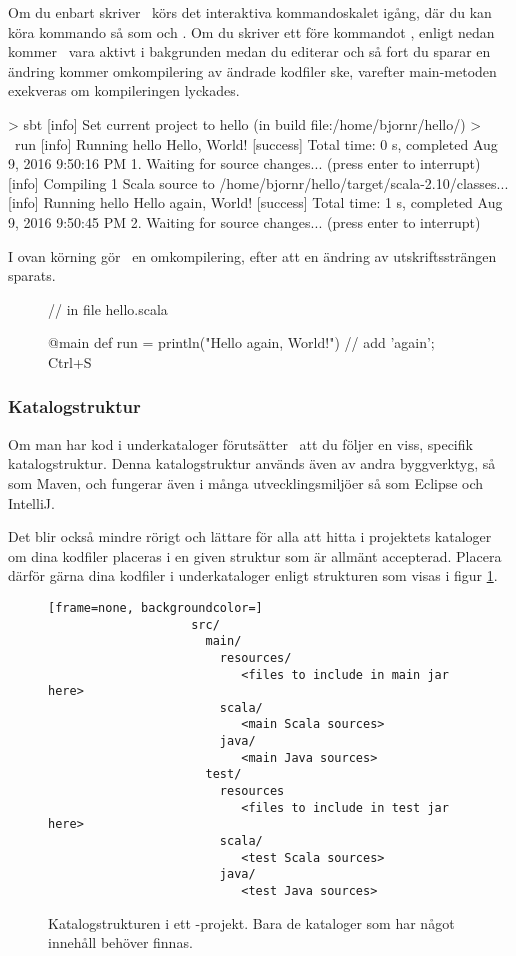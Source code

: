 Om du enbart skriver \sbt\ körs det interaktiva kommandoskalet igång, där du kan köra kommando så som  och . Om du skriver ett \code{~} före kommandot , enligt nedan kommer \sbt\ vara aktivt i bakgrunden medan du editerar och så fort du sparar en ändring kommer omkompilering av ändrade kodfiler ske, varefter main-metoden exekveras om kompileringen lyckades.

\begin{REPLnonum}
> sbt
[info] Set current project to hello (in build file:/home/bjornr/hello/)
> ~run
[info] Running hello
Hello, World!
[success] Total time: 0 s, completed Aug 9, 2016 9:50:16 PM
1. Waiting for source changes... (press enter to interrupt)
[info] Compiling 1 Scala source to /home/bjornr/hello/target/scala-2.10/classes...
[info] Running hello
Hello again, World!
[success] Total time: 1 s, completed Aug 9, 2016 9:50:45 PM
2. Waiting for source changes... (press enter to interrupt)
\end{REPLnonum}

\noindent I ovan körning gör \sbt\ en omkompilering, efter att en ändring av utskriftssträngen sparats.
\begin{figure}[H]
\begin{Code}
// in file hello.scala

@main def run = println("Hello again, World!") // add 'again'; Ctrl+S
\end{Code}
\end{figure}

\subsubsection{Katalogstruktur}

Om man har kod i underkataloger förutsätter \sbt\ att du följer en viss, specifik katalogstruktur. Denna katalogstruktur används även av andra byggverktyg, så som Maven, och fungerar även i många utvecklingsmiljöer så som Eclipse och IntelliJ.

Det blir också mindre rörigt och lättare för alla att hitta i projektets kataloger om dina kodfiler placeras i en given struktur som är allmänt accepterad.
Placera därför gärna dina kodfiler i underkataloger enligt strukturen som visas i figur \ref{fig:sbt:dir-structure}.

\begin{figure}[H]
\centering

\begin{lstlisting}[frame=none, backgroundcolor=]
					src/
					  main/
					    resources/
					       <files to include in main jar here>
					    scala/
					       <main Scala sources>
					    java/
					       <main Java sources>
					  test/
					    resources
					       <files to include in test jar here>
					    scala/
					       <test Scala sources>
					    java/
					       <test Java sources>
\end{lstlisting}

\caption{Katalogstrukturen i ett \sbt-projekt. Bara de kataloger som har något innehåll behöver finnas.}
\label{fig:sbt:dir-structure}
\end{figure}

